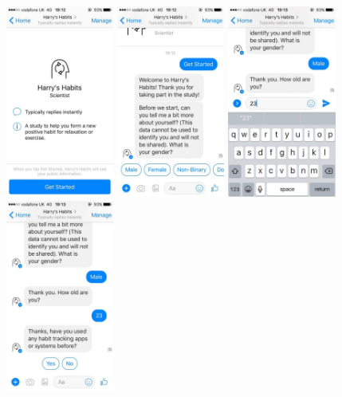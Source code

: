 \begin{figure}[H]
  \centering
  \includegraphics[width=1.4in]{resources/design/process/1.jpg}
  \hspace{10px}
  \includegraphics[width=1.4in]{resources/design/process/2.jpg}
  \hspace{10px}
  \includegraphics[width=1.4in]{resources/design/process/3.jpg}
  \hspace{10px}
  \includegraphics[width=1.4in]{resources/design/process/4.jpg}

\end{figure}
